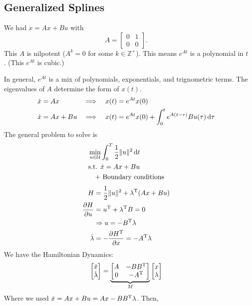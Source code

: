 \subsection{Generalized Splines}
We had $\dot x=Ax+Bu$ with
\[ A = \begin{bmatrix}
    0 & 1 \\ 0 & 0
  \end{bmatrix}. \]
This $A$ is nilpotent ($A^k=0$ for some $k\in\mathbb Z^+$). This means $e^{At}$ is a polynomial in $t$. (This $e^{At}$ is cubic.)

In general, $e^{At}$ is a mix of polynomials, exponentials, and trignometric terms. The eigenvalues of $A$ determine the form of $x(t)$.
\begin{alignat}{3}
  \dot x &= Ax && \Longrightarrow & \; x(t) &= e^{At} x(0) \\
  \dot x &= Ax + Bu && \Longrightarrow & x(t) &= e^{At} x(0) + \int_0^t e^{A(t-\tau)} Bu(\tau) \mathop{}\!\mathrm{d}\tau
\end{alignat}
The general problem to solve is
\begin{align}
  & \min_{u\in\mathcal U} \int_0^T \frac{1}{2} \Vert u\Vert^2 \mathop{}\!\mathrm{d} t \\
  & \text{s.t. } \dot x = Ax + Bu \\
  & \quad \text{+ Boundary conditions}
\end{align}
\begin{align}
  H &= \frac{1}{2} \Vert u\Vert^2 + \lambda^\text{T} (Ax+Bu) \\
  \frac{\partial H}{\partial u} &= u^\text{T} + \lambda^\text{T} B = 0 \\
    & \Rightarrow u = -B^\text{T}\lambda \\
  \dot\lambda &= -\frac{\partial H^\text{T}}{\partial x} = -A^\text{T}\lambda
\end{align}
We have the Hamiltonian Dynamics:
\begin{gather}
  \begin{bmatrix}
    \dot x \\ \dot\lambda
  \end{bmatrix} =
  \underbrace{
    \begin{bmatrix}
      A & -BB^\text{T} \\
      0 & -A^\text{T}
    \end{bmatrix}
  }_{M}
  \begin{bmatrix}
    x \\ \lambda
  \end{bmatrix}
\end{gather}
Where we used $\dot x=Ax+Bu=Ax-BB^\text{T}\lambda$. Then,
